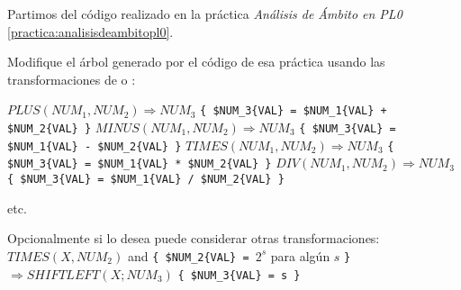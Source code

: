 \label{practica:treetransofrmationsPL0}
Partimos del código realizado en la práctica 
{\it Análisis de Ámbito en PL0}
\ref{practica:analisisdeambitopl0}.

Modifique el árbol generado por el código de esa práctica
usando las transformaciones de  o
:

\vspace{0.25cm}
$PLUS(NUM_1, NUM_2) \Longrightarrow NUM_3$ \verb|{ $NUM_3{VAL} = $NUM_1{VAL} + $NUM_2{VAL} }|
\vspace{0.25cm}
$MINUS(NUM_1, NUM_2) \Longrightarrow NUM_3$ \verb|{ $NUM_3{VAL} = $NUM_1{VAL} - $NUM_2{VAL} }|
\vspace{0.25cm}
$TIMES(NUM_1, NUM_2) \Longrightarrow NUM_3$ \verb|{ $NUM_3{VAL} = $NUM_1{VAL} * $NUM_2{VAL} }|
\vspace{0.25cm}
$DIV(NUM_1, NUM_2) \Longrightarrow NUM_3$ \verb|{ $NUM_3{VAL} = $NUM_1{VAL} / $NUM_2{VAL} }|

etc.

Opcionalmente si lo desea puede considerar otras transformaciones: 
\vspace{0.25cm}
$TIMES(X, NUM_2)$ and \verb|{ $NUM_2{VAL} = |$2^s$ para algún $s$ \verb|}| $\Longrightarrow SHIFTLEFT(X; NUM_3)$ \verb|{ $NUM_3{VAL} = s }|
\vspace{0.25cm}
